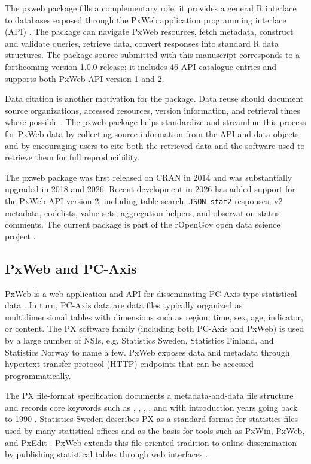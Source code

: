 \documentclass[11pt]{article}
\DeclareRobustCommand{\pkg}[1]{\textsf{#1}}
\DeclareRobustCommand{\proglang}[1]{\textsf{#1}}
\DeclareRobustCommand{\code}[1]{\texttt{\detokenize{#1}}}
\begin{document}
The \pkg{pxweb} package fills a complementary role: it provides a general \proglang{R} interface to databases exposed through the PxWeb application programming interface (API) \citep{PxToolsPxWeb2Intro}.
The package can navigate PxWeb resources, fetch metadata, construct and validate queries, retrieve data, convert responses into standard \proglang{R} data structures.
The package source submitted with this manuscript corresponds to a forthcoming version 1.0.0 release; it includes 46 API catalogue entries and supports both PxWeb API version 1 and 2.

Data citation is another motivation for the package.
Data reuse should document source organizations, accessed resources, version information, and retrieval times where possible \citep{Parsons2019}.
The \pkg{pxweb} package helps standardize and streamline this process for PxWeb data by collecting source information from the API and data objects and by encouraging users to cite both the retrieved data and the software used to retrieve them for full reproducibility.

The \pkg{pxweb} package was first released on CRAN in 2014 and was substantially upgraded in 2018 and 2026.
Recent development in 2026 has added support for the PxWeb API version 2, including table search, \texttt{JSON-stat2} responses, v2 metadata, codelists, value sets, aggregation helpers, and observation status comments.
The current package is part of the rOpenGov open data science project \citep{Lahti13icml}.

\subsection[PxWeb and PC-Axis]{PxWeb and PC-Axis}
\label{sec:pxweb-pcaxis}

PxWeb is a web application and API for disseminating PC-Axis-type statistical data \citep{PxToolsPxWeb2Intro}.
In turn, PC-Axis data are data files typically organized as multidimensional tables with dimensions such as region, time, sex, age, indicator, or content.
The PX software family (including both PC-Axis and PxWeb) is used by a large number of NSIs, e.g. Statistics Sweden, Statistics Finland, and Statistics Norway \citep{SCBPxPrograms,StatisticsFinlandPxSuite,StatisticsNorwayAPI} to name a few.
PxWeb exposes data and metadata through hypertext transfer protocol (HTTP) endpoints that can be accessed programmatically.

The PX file-format specification documents a metadata-and-data file structure and records core keywords such as \code{CONTENTS}, \code{DATA}, \code{MATRIX}, \code{STUB}, and \code{CODES} with introduction years going back to 1990 \citep{SCBPxFileFormat2013}. %
Statistics Sweden describes PX as a standard format for statistics files used by many statistical offices and as the basis for tools such as PxWin, PxWeb, and PxEdit \citep{SCBPxPrograms}.
PxWeb extends this file-oriented tradition to online dissemination by publishing statistical tables through web interfaces \citep{PxToolsPxWeb2Intro}.
\end{document}
